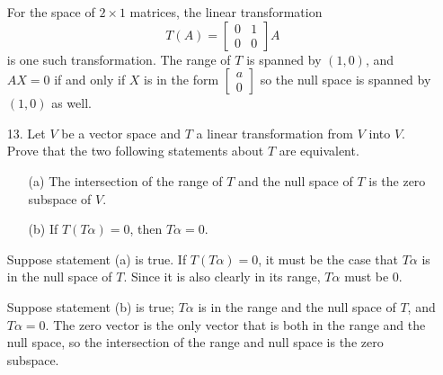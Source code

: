 \documentclass{article}
\begin{document}
\begin{enumerate}[listparindent=\parindent]
    For the space of \(2 \times 1\) matrices, the linear transformation \[T(A) = \begin{bmatrix}0 & 1 \\ 0 & 0\end{bmatrix}A\] is one such transformation.
    The range of \(T\) is spanned by \((1, 0)\), and \(AX = 0\) if and only if \(X\) is in the form \(\begin{bmatrix} a \\ 0 \end{bmatrix}\) so the null space is spanned by \((1, 0)\) as well.

\item[13.] Let \(V\) be a vector space and \(T\) a linear transformation from \(V\) into \(V\). Prove that the two following statements about \(T\) are equivalent.
    \begin{enumerate}
        \item[(a)] The intersection of the range of \(T\) and the null space of \(T\) is the zero subspace of \(V\).
        \item[(b)] If \(T(T\alpha) = 0\), then \(T\alpha = 0\).
    \end{enumerate}

    Suppose statement (a) is true. If \(T(T\alpha) = 0\), it must be the case that \(T\alpha\) is in the null space of \(T\).
    Since it is also clearly in its range, \(T\alpha\) must be 0.

    Suppose statement (b) is true; \(T\alpha\) is in the range and the null space of \(T\), and \(T\alpha = 0\).
    The zero vector is the only vector that is both in the range and the null space, so the intersection of the range and null space is the zero subspace.
\end{enumerate}
\end{document}
